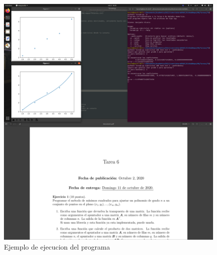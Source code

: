\documentclass[11pt]{article}
\begin{document}
\begin{figure}[h]
	\centering
		\includegraphics[width=1\textwidth]{trs2.png}
	\caption{Ejemplo de ejecucion del programa}
	\label{fig: ej2}
\end{figure}


    
    
    
\end{document}
